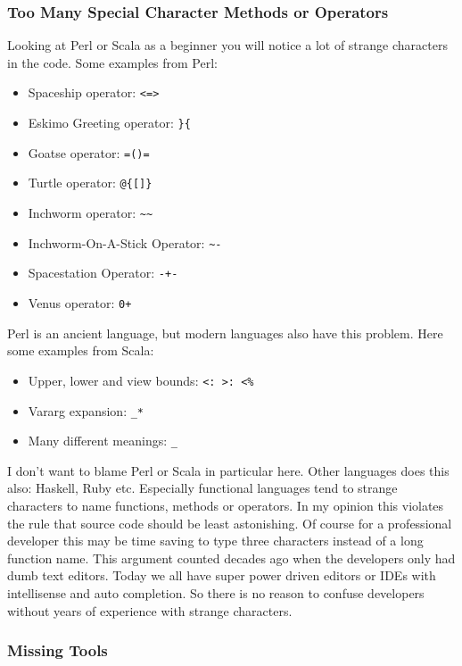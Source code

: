 \documentclass[a4paper,12pt]{article}
\begin{document}

\subsubsection{Too Many Special Character Methods or Operators}

Looking at Perl or Scala as a beginner you will notice a lot of strange characters in the code.
Some examples from Perl\cite{secret-perl-operators}:

\begin{itemize}
	\item Spaceship operator: \verb|<=>|
	\item Eskimo Greeting operator: \verb|}{|
	\item Goatse operator: \verb|=()=|
	\item Turtle operator: \verb|@{[]}|
	\item Inchworm operator: \verb|~~|
	\item Inchworm-On-A-Stick Operator: \verb|~-|
	\item Spacestation Operator: \verb|-+-|
	\item Venus operator: \verb|0+|
\end{itemize}

Perl is an ancient language, but modern languages also have this problem. Here some examples from Scala\cite{special-operators-scala}:

\begin{itemize}
	\item Upper, lower and view bounds: \verb|<: >: <%|
	\item Vararg expansion: \verb|_*|
	\item Many different meanings: \verb|_|
\end{itemize}

I don't want to blame Perl or Scala in particular here. Other languages does this also: Haskell, Ruby etc. Especially functional languages tend to strange characters to name functions, methods or operators. In my opinion this violates the rule that source code should be least astonishing. Of course for a professional developer this may be time saving to type three characters instead of a long function name. This argument counted decades ago when the developers only had dumb text editors. Today we all have super power driven editors or IDEs with intellisense and auto completion. So there is no reason to confuse developers without years of experience with strange characters.

\subsubsection{Missing Tools}
\end{document}
